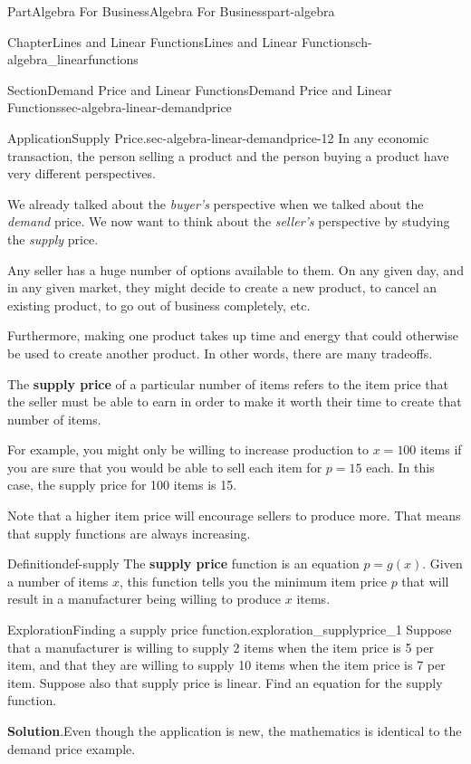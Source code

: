 \documentclass{tufte-book}
\newcommand{\blocktitlefont}{\relax}
\newcommand{\terminology}[1]{\textbf{#1}}
\numberwithin{equation}{chapter}
\begin{document}
\begin{partptx}{Part}{Algebra For Business}{}{Algebra For Business}{}{}{part-algebra}
\begin{chapterptx}{Chapter}{Lines and Linear Functions}{}{Lines and Linear Functions}{}{}{ch-algebra_linearfunctions}
\begin{sectionptx}{Section}{Demand Price and Linear Functions}{}{Demand Price and Linear Functions}{}{}{sec-algebra-linear-demandprice}
\begin{insight}{Application}{Supply Price.}{sec-algebra-linear-demandprice-12}
In any economic transaction, the person selling a product and the person  buying a product have very different perspectives.%
\par
We already talked about the \emph{buyer's} perspective when we talked about the \emph{demand} price.  We now want to think about the \emph{seller's} perspective by studying the \emph{supply} price.%
\par
Any seller has a huge number of options available to them.   On any given day, and in any given market, they might decide to create a new product, to cancel an existing product, to go out of business completely, etc.%
\par
Furthermore, making one product takes up time and energy that could otherwise be used to create another product.  In other words, there are many tradeoffs.%
\par
The \terminology{supply price} of a particular number of items refers to the item price that the seller must be able to earn in order to make it worth their time to create that number of items.%
\par
For example, you might only be willing to increase production to \(x=100\) items if you are sure that you would be able to sell each item for \(p=15\)\textdollar{} each.  In this case, the supply price for 100 items is 15\textdollar{}.%
\par
Note that a higher item price will encourage sellers to produce more.  That means that supply functions are always increasing.%
\end{insight}
\begin{definition}{Definition}{}{def-supply}%
The \terminology{supply price} function is an equation \(p = g(x)\). Given a number of items \(x\), this function tells you the minimum item price \(p\) that will result in a manufacturer being willing to produce \(x\) items.%
\end{definition}
\begin{exploration}{Exploration}{Finding a supply price function.}{exploration_supplyprice_1}%
Suppose that a manufacturer is willing to supply 2 items when the item price is 5 \textdollar{} per item, and that they are willing to supply 10 items when the item price is 7 \textdollar{} per item.  Suppose also that supply price is linear. Find an equation for the supply function.%
\par\smallskip%
\noindent\textbf{\blocktitlefont Solution}.\hypertarget{exploration_supplyprice_1-3}{}\quad{}Even though the application is new, the mathematics is identical to the demand price example.%

\end{exploration}
\end{sectionptx}
\end{chapterptx}
\end{partptx}
\end{document}

